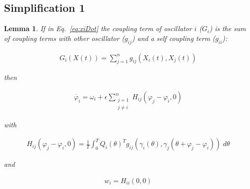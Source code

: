 \documentclass{article}
\newtheorem{simplification1}{Lemma}
\begin{document}
\subsection*{Simplification 1}

\begin{simplification1}

If in Eq.~\ref{eq:xiDot} the coupling term of oscillator $i$ ($G_i$) is the
sum of coupling terms with other oscillator ($g_{ij}$) and a self coupling
term ($g_{ii}$):

\begin{align}
G_i(X(t))=\sum_{j=1}^n g_{ij}(X_i(t), X_j(t))
\label{eq:restrictedGi}
\end{align}

\noindent then

\begin{align}
\dot{\varphi_i}=\omega_i+\epsilon\sum_{\substack{j=1\\j\neq i}}^n H_{ij}(\varphi_j-\varphi_i,0)
\label{eq:phiiDotSimplified}
\end{align}

\noindent with

\begin{align}
H_{ij}(\varphi_j-\varphi_i,0)=\frac{1}{T}\int_0^TQ_i(\theta)^Tg_{ij}(\gamma_i(\theta),\gamma_j(\theta+\varphi_j-\varphi_i))\;d\theta
\label{eq:Hij}
\end{align}

\noindent and

\begin{align}
w_i=H_{ii}(0,0)
\label{eq:wi}
\end{align}

\end{simplification1}
\end{document}
